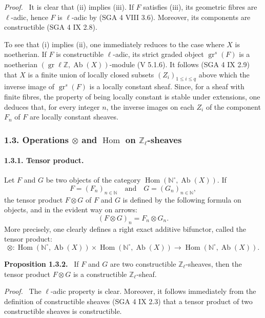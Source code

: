 \documentclass[11pt]{article}
\newenvironment{statement}[1]{\par\medskip\noindent\textbf{#1.}\ }{\par\medskip}
\newenvironment{prooftext}[1][Proof]{\par\noindent\emph{#1.}\ }{\par\medskip}
\DeclareMathOperator{\Hom}{Hom}
\providecommand{\Hom}{\operatorname{Hom}}
\providecommand{\Ab}{\operatorname{Ab}}
\providecommand{\Ab}{\operatorname{Ab}}
\providecommand{\Hom}{\operatorname{Hom}}
\begin{document}
\begin{prooftext}[Proof]
It is clear that (ii) implies (iii). If \(F\) satisfies (iii), its geometric fibres are \(\ell\)-adic, hence \(F\) is \(\ell\)-adic by (SGA 4 VIII 3.6). Moreover, its components are constructible (SGA 4 IX 2.8).

To see that (i) implies (ii), one immediately reduces to the case where \(X\) is noetherian. If \(F\) is constructible \(\ell\)-adic, its strict graded object \(\operatorname{gr}^s(F)\) is a noetherian \((\operatorname{gr}\ell\mathbb Z,\Ab(X))\)-module (V 5.1.6). It follows (SGA 4 IX 2.9) that \(X\) is a finite union of locally closed subsets \((Z_i)_{1\le i\le q}\) above which the inverse image of \(\operatorname{gr}^s(F)\) is a locally constant sheaf. Since, for a sheaf with finite fibres, the property of being locally constant is stable under extensions, one deduces that, for every integer \(n\), the inverse images on each \(Z_i\) of the component \(F_n\) of \(F\) are locally constant sheaves.
\end{prooftext}

\subsubsection*{1.3. Operations \(\otimes\) and \(\Hom\) on \(\mathbb Z_\ell\)-sheaves}

\paragraph{1.3.1. Tensor product.}
Let \(F\) and \(G\) be two objects of the category \(\Hom(\mathbb N^\circ,\Ab(X))\). If
\[
F=(F_n)_{n\in\mathbb N}\quad\text{and}\quad G=(G_n)_{n\in\mathbb N},
\]
the tensor product \(F\otimes G\) of \(F\) and \(G\) is defined by the following formula on objects, and in the evident way on arrows:
\[
(F\otimes G)_n=F_n\otimes G_n.
\]
More precisely, one clearly defines a right exact additive bifunctor, called the tensor product:
\[
\otimes:\Hom(\mathbb N^\circ,\Ab(X))\times \Hom(\mathbb N^\circ,\Ab(X))
\longrightarrow \Hom(\mathbb N^\circ,\Ab(X)).
\]

\begin{statement}{Proposition 1.3.2}
If \(F\) and \(G\) are two constructible \(\mathbb Z_\ell\)-sheaves, then the tensor product \(F\otimes G\) is a constructible \(\mathbb Z_\ell\)-sheaf.
\end{statement}

\begin{prooftext}[Proof]
The \(\ell\)-adic property is clear. Moreover, it follows immediately from the definition of constructible sheaves (SGA 4 IX 2.3) that a tensor product of two constructible sheaves is constructible.
\end{prooftext}
\end{document}
